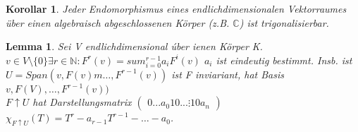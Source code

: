 \documentclass{report}
\newcommand{\N}{\mathbb{N}}
\newcommand{\C}{\mathbb{C}}
\theoremstyle{customrem}
\theoremstyle{customdef}
\newtheorem{lemma}[definition]{Lemma}
\newtheorem{korrolar}[definition]{Korollar}
\theoremstyle{customenv}
\begin{document}
\begin{korrolar}
  Jeder Endomorphismus eines endlichdimensionalen Vektorraumes \"uber einen
  algebraisch abgeschlossenen K\"orper (z.B. \(\C\)) ist trigonalisierbar.
\end{korrolar}

\begin{lemma}
  Sei V endlichdimensional \'uber ienen K\"orper K.\\
  \(v \in V \setminus \{0\} \exists r \in \N : F^r(v) = sum_{i=0}^{r-1}a_i F^i(v)\) \(a_i\) ist eindeutig bestimmt.
  Insb. ist \(U = Span(v, F(v)m \dots, F^{r-1}(v))\) ist F inviariant, hat Basis \(v, F(V), \dots, F^{r-1}(v))\)\\
  \(F \uparrow U\) hat Darstellungsmatrix
  \(
  \begin{pmatrix}
  0     ... a_0
  1 0   ... \vdots
    1 0     a_n
  \end{pmatrix}
  \)
  \(\chi_{F \uparrow U}(T) = T^r - a_{r-1} T^{r-1} - \dots - a_0\).
  

\end{lemma}
\end{document}
